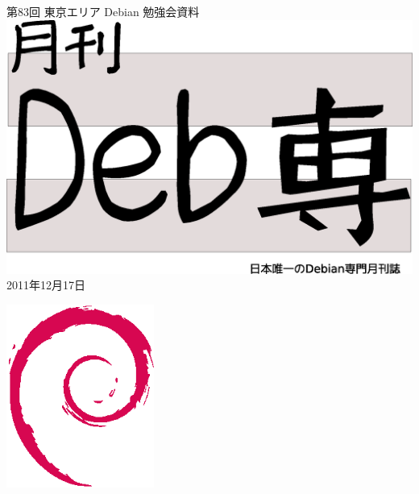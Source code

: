\documentclass[mingoth,a4paper]{jsarticle}
\newcommand{\debmtgyear}{2011}
\newcommand{\debmtgmonth}{12}
\newcommand{\debmtgdate}{17}
\newcommand{\debmtgnumber}{83}
\begin{document}
\begin{titlepage}
\thispagestyle{empty}

\vspace*{-2cm}
第\debmtgnumber{}回 東京エリア Debian 勉強会資料\\
\hspace*{-2cm}
\includegraphics[width=210mm]{image201003/debsen.eps}\\
\hfill{}\debmtgyear{}年\debmtgmonth{}月\debmtgdate{}日




\vspace*{-2cm}
\hfill{}\includegraphics[height=6cm]{image200502/openlogo-nd.eps}
\end{titlepage}

\end{document}
